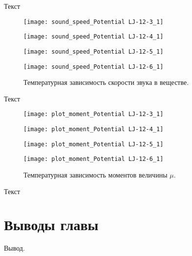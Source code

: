 Текст

\begin{figure}[htbp!]
\begin{center}
\begin{minipage}[h]{0.45\linewidth}
\texttt{[image: sound\_speed\_Potential LJ-12-3\_1]}
\end{minipage}
\begin{minipage}[h]{0.45\linewidth}
\texttt{[image: sound\_speed\_Potential LJ-12-4\_1]}
\end{minipage}


\begin{minipage}[h]{0.45\linewidth}
\texttt{[image: sound\_speed\_Potential LJ-12-5\_1]}
\end{minipage}
\begin{minipage}[h]{0.45\linewidth}
\texttt{[image: sound\_speed\_Potential LJ-12-6\_1]}
\end{minipage}
\caption{Температурная зависимость скорости звука в веществе.}
\label{ris14}
\end{center}
\end{figure}

Текст

\begin{figure}[htbp!]
\begin{center}
\begin{minipage}[h]{0.45\linewidth}
\texttt{[image: plot\_moment\_Potential LJ-12-3\_1]}
\end{minipage}
\begin{minipage}[h]{0.45\linewidth}
\texttt{[image: plot\_moment\_Potential LJ-12-4\_1]}
\end{minipage}


\begin{minipage}[h]{0.45\linewidth}
\texttt{[image: plot\_moment\_Potential LJ-12-5\_1]}
\end{minipage}
\begin{minipage}[h]{0.45\linewidth}
\texttt{[image: plot\_moment\_Potential LJ-12-6\_1]}
\end{minipage}
\caption{Температурная зависимость моментов величины $\mu$.}
\label{ris14}
\end{center}
\end{figure}

Текст

\section{Выводы главы}\label{C2_4}
Вывод.
